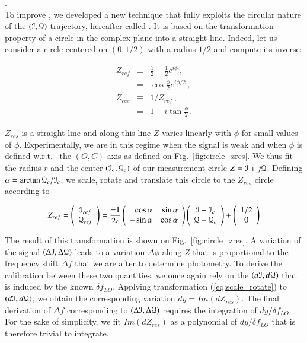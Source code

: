 .\\

To improve \rf, we developed a new technique that fully exploits the circular
nature of the $(\mathcal{I},\mathcal{Q})$ trajectory, hereafter called \cf. It is
  based on the transformation property of a circle in the complex plane into a
  straight line. Indeed, let us consider a circle centered on $(0,1/2)$ with a
  radius $1/2$ and compute its inverse:

\begin{eqnarray}
Z_{ref} &\equiv&\frac{1}{2} + \frac{1}{2}e^{i\phi}\,, \\
&=&\cos\frac{\phi}{2}e^{i\phi/2}\,,\\
Z_{res} &\equiv& 1/Z_{ref}\,, \label{eq:z_res} \\
&=&1-i\tan\frac{\phi}{2}\,.
\label{eq:z_res}
\end{eqnarray}

$Z_{res}$ is a straight line and along this line $Z$ varies linearly with
$\phi$ for small values of $\phi$. Experimentally, we are in this regime
when the signal is weak and when $\phi$ is defined w.r.t.~ the $(O,C)$ axis
as defined on Fig.~\ref{fig:circle_zres}. We thus fit the radius $r$ and the
center $(\mathcal{I}_c,\mathcal{Q}_c)$ of our measurement circle $Z=\mathcal{I}+j\mathcal{Q}$. Defining
$\alpha=\arctan\mathcal{Q}_c/\mathcal{I}_c$, we scale, rotate and translate this
circle to the $Z_{res}$ circle according to

\begin{equation}
Z_{ref} = \left(\begin{array}{c}
\mathcal{I}_{ref}\\
\mathcal{Q}_{ref}\end{array}\right) = 
\frac{-1}{2r}\left(\begin{array}{rr}
\cos\alpha & \sin\alpha\\
-\sin\alpha & \cos\alpha\end{array}\right)
\left(\begin{array}{c}
\mathcal{I}-\mathcal{I}_c\\
\mathcal{Q}-\mathcal{Q}_c\end{array}\right) +
\left(\begin{array}{c}
1/2\\
0\end{array}\right)
\label{eq:scale_rotate}
\end{equation}

The result of this transformation is shown on Fig.~\ref{fig:circle_zres}. A
variation of the signal $(\Delta\mathcal{I},\Delta\mathcal{Q})$ leads to a variation
$\Delta\phi$ along $Z$ that is proportional to the frequency shift $\Delta f$
that we are after to determine photometry. To derive the calibration between
these two quantities, we once again rely on the $(d\mathcal{I},d\mathcal{Q})$ that is induced by
the known $\delta f_{LO}$. Applying transformation (\ref{eq:scale_rotate}) to
$(d\mathcal{I},d\mathcal{Q})$, we obtain the corresponding variation $dy = Im(dZ_{res})$. The
final derivation of $\Delta f$ corresponding to $(\Delta\mathcal{I},\Delta\mathcal{Q})$ requires
the integration of $dy/\delta f_{LO}$. For the sake of simplicity, we fit
$Im(dZ_{res})$ as a polynomial of $dy/\delta f_{LO}$ that is therefore trivial
to integrate.

